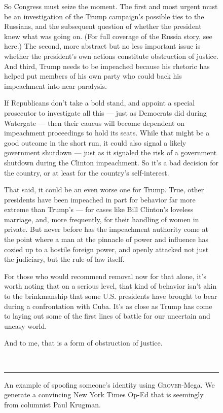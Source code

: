 \documentclass{article}
\newcommand{\modelname}{{\textsc{Grover}}}
\begin{document}
\begin{figure}[t]
{So Congress must seize the moment. The first and most urgent must be an investigation of the Trump campaign’s possible ties to the Russians, and the subsequent question of whether the president knew what was going on. (For full coverage of the Russia story, see here.) The second, more abstract but no less important issue is whether the president’s own actions constitute obstruction of justice. And third, Trump needs to be impeached because his rhetoric has helped put members of his own party who could back his impeachment into near paralysis.

If Republicans don’t take a bold stand, and appoint a special prosecutor to investigate all this — just as Democrats did during Watergate — then their caucus will become dependent on impeachment proceedings to hold its seats. While that might be a good outcome in the short run, it could also signal a likely government shutdown — just as it signaled the risk of a government shutdown during the Clinton impeachment. So it’s a bad decision for the country, or at least for the country’s self-interest.

That said, it could be an even worse one for Trump. True, other presidents have been impeached in part for behavior far more extreme than Trump’s — for cases like Bill Clinton’s loveless marriage, and, more frequently, for their handling of women in private. But never before has the impeachment authority come at the point where a man at the pinnacle of power and influence has cozied up to a hostile foreign power, and openly attacked not just the judiciary, but the rule of law itself.

For those who would recommend removal now for that alone, it’s worth noting that on a serious level, that kind of behavior isn’t akin to the brinkmanship that some U.S. presidents have brought to bear during a confrontation with Cuba. It’s as close as Trump has come to laying out some of the first lines of battle for our uncertain and uneasy world.

And to me, that is a form of obstruction of justice.
} \\
\hrule
\caption{An example of spoofing someone's identity using \modelname-Mega. We generate a convincing New York Times Op-Ed that is seemingly from columnist Paul Krugman.}
\label{fig:paulkrugman}
\end{figure}
 
\end{document}
